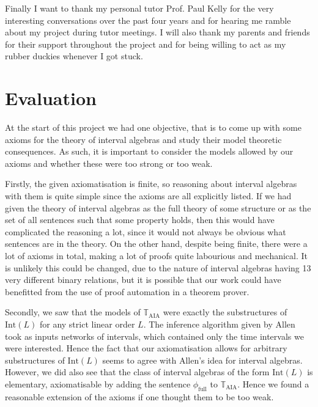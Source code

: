 \documentclass[11pt %
              ]{article}
\newcommand{\theory}{\mathbb{T}}
\newcommand{\taia}{\theory_\text{AIA}}
\newcommand{\inter}[1][-]{\text{Int}\left(#1\right)}
\newcommand{\defformula}[1]{\phi_{#1}}
\newcommand{\allints}{\defformula{\text{full}}}
\theoremstyle{plain}
\theoremstyle{definition}
\theoremstyle{remark}
\begin{document}
Finally I want to thank my personal tutor Prof. Paul Kelly for the very interesting conversations
over the past four years and for hearing me ramble about my project during tutor meetings. I will
also thank my parents and friends for their support throughout the project and for being willing
to act as my rubber duckies whenever I got stuck.
\vfill
\hspace{0pt}

\newpage
\tableofcontents

\newpage
\pagestyle{fancy}
\fancyhf{}
\lhead{\nouppercase{\leftmark}}
\fancyfoot[C]{\thepage}
\setlength{\headheight}{13.59999pt}
\addtolength{\topmargin}{-1.59999pt}




\newpage


\newpage


\newpage
\section{Evaluation}

At the start of this project we had one objective, that is to come up with some axioms for the
theory of interval algebras and study their model theoretic consequences. As such, it is important
to consider the models allowed by our axioms and whether these were too strong or too weak.

Firstly, the given axiomatisation is finite, so reasoning about interval algebras with them is
quite simple since the axioms are all explicitly listed. If we had given the theory of interval
algebras as the full theory of some structure or as the set of all sentences such that some property
holds, then this would have complicated the reasoning a lot, since it would not always be obvious
what sentences are in the theory. On the other hand, despite being finite, there were a lot of
axioms in total, making a lot of proofs quite labourious and mechanical. It is unlikely this could
be changed, due to the nature of interval algebras having 13 very different binary relations, but
it is possible that our work could have benefitted from the use of proof automation in a theorem
prover.

Secondly, we saw that the models of $\taia$ were exactly the substructures of $\inter[L]$ for any
strict linear order $L$. The inference algorithm given by Allen took as inputs networks of
intervals, which contained only the time intervals we were interested. Hence the fact that our
axiomatisation allows for arbitrary substructures of $\inter[L]$ seems to agree with Allen's
idea for interval algebras. However, we did also see that the class of interval algebras of the form
$\inter[L]$ is elementary, axiomatisable by adding the sentence $\allints$ to $\taia$. Hence we
found a reasonable extension of the axioms if one thought them to be too weak.
\end{document}
